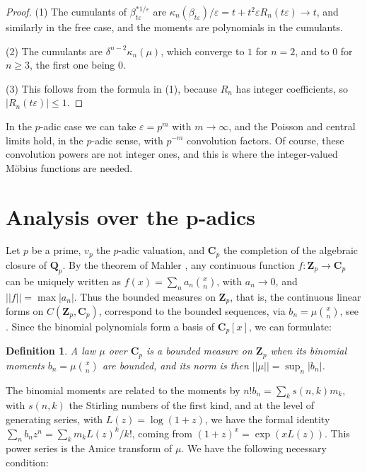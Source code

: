 \documentclass[11pt]{amsart}
\newtheorem{definition}[theorem]{Definition}
\theoremstyle{definition}
\begin{document}
\begin{proof}
(1) The cumulants of $\beta_{t\varepsilon}^{*1/\varepsilon}$ are $\kappa_n(\beta_{t\varepsilon})/\varepsilon=t+t^2\varepsilon R_n(t\varepsilon)\to t$, and similarly in the free case, and the moments are polynomials in the cumulants.

(2) The cumulants are $\delta^{n-2}\kappa_n(\mu)$, which converge to $1$ for $n=2$, and to $0$ for $n\geq3$, the first one being $0$.

(3) This follows from the formula in (1), because $R_n$ has integer coefficients, so $|R_n(t\varepsilon)|\leq1$.
\end{proof}

In the $p$-adic case we can take $\varepsilon=p^m$ with $m\to\infty$, and the Poisson and central limits hold, in the $p$-adic sense, with $p^{-m}$ convolution factors. Of course, these convolution powers are not integer ones, and this is where the integer-valued Möbius functions are needed.

\section{Analysis over the p-adics}

Let $p$ be a prime, $v_p$ the $p$-adic valuation, and $\mathbf C_p$ the completion of the algebraic closure of $\mathbf Q_p$. By the theorem of Mahler \cite{mah}, any continuous function $f:\mathbf Z_p\to\mathbf C_p$ can be uniquely written as $f(x)=\sum_na_n\binom{x}{n}$, with $a_n\to0$, and $||f||=\max|a_n|$. Thus the bounded measures on $\mathbf Z_p$, that is, the continuous linear forms on $C(\mathbf Z_p,\mathbf C_p)$, correspond to the bounded sequences, via $b_n=\mu\binom{x}{n}$, see \cite{ama,rob}. Since the binomial polynomials form a basis of $\mathbf C_p[x]$, we can formulate:

\begin{definition}
A law $\mu$ over $\mathbf C_p$ is a bounded measure on $\mathbf Z_p$ when its binomial moments $b_n=\mu\binom{x}{n}$ are bounded, and its norm is then $||\mu||=\sup_n|b_n|$.
\end{definition}

The binomial moments are related to the moments by $n!b_n=\sum_ks(n,k)m_k$, with $s(n,k)$ the Stirling numbers of the first kind, and at the level of generating series, with $L(z)=\log(1+z)$, we have the formal identity $\sum_nb_nz^n=\sum_km_kL(z)^k/k!$, coming from $(1+z)^x=\exp(xL(z))$. This power series is the Amice transform of $\mu$. We have the following necessary condition:
\end{document}
